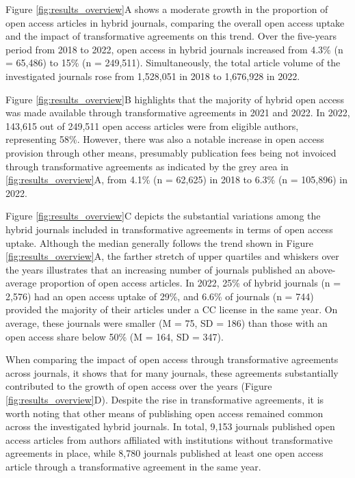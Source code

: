 \documentclass[a4paper,man,floatsintext,longtable,noextraspace,12pt]{apa6}
\begin{document}
Figure \ref{fig:results_overview}A shows a moderate growth in the
proportion of open access articles in hybrid journals, comparing the
overall open access uptake and the impact of transformative agreements
on this trend. Over the five-years period from 2018 to 2022, open access
in hybrid journals increased from 4.3\% (n = 65,486) to 15\% (n =
249,511). Simultaneously, the total article volume of the investigated
journals rose from 1,528,051 in 2018 to 1,676,928 in 2022.

Figure \ref{fig:results_overview}B highlights that the majority of
hybrid open access was made available through transformative agreements
in 2021 and 2022. In 2022, 143,615 out of 249,511 open access articles
were from eligible authors, representing 58\%. However, there was also a
notable increase in open access provision through other means,
presumably publication fees being not invoiced through transformative
agreements as indicated by the grey area in \ref{fig:results_overview}A,
from 4.1\% (n = 62,625) in 2018 to 6.3\% (n = 105,896) in 2022.

Figure \ref{fig:results_overview}C depicts the substantial variations
among the hybrid journals included in transformative agreements in terms
of open access uptake. Although the median generally follows the trend
shown in Figure \ref{fig:results_overview}A, the farther stretch of
upper quartiles and whiskers over the years illustrates that an
increasing number of journals published an above-average proportion of
open access articles. In 2022, 25\% of hybrid journals (n = 2,576) had
an open access uptake of 29\%, and 6.6\% of journals (n = 744) provided
the majority of their articles under a CC license in the same year. On
average, these journals were smaller (M = 75, SD = 186) than those with
an open access share below 50\% (M = 164, SD = 347).

When comparing the impact of open access through transformative
agreements across journals, it shows that for many journals, these
agreements substantially contributed to the growth of open access over
the years (Figure \ref{fig:results_overview}D). Despite the rise in
transformative agreements, it is worth noting that other means of
publishing open access remained common across the investigated hybrid
journals. In total, 9,153 journals published open access articles from
authors affiliated with institutions without transformative agreements
in place, while 8,780 journals published at least one open access
article through a transformative agreement in the same year.
\end{document}
